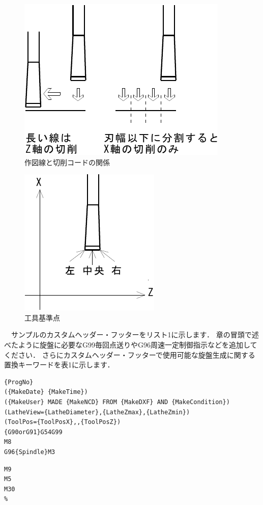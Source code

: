 \begin{minipage}{0.6\textwidth}
\begin{figure}[H]
\centering
\includegraphics{No2/fig/groove1-crop.pdf}
\caption{作図線と切削コードの関係}
\label{fig:ngroove1.pdf}
\end{figure}
\end{minipage}
\begin{minipage}{0.4\textwidth}
\begin{figure}[H]
\centering
\includegraphics{No2/fig/groove2-crop.pdf}
\caption{工具基準点}
\label{fig:groove2.pdf}
\end{figure}
\end{minipage}

\vspace*{1zh}
　サンプルのカスタムヘッダー・フッターをリスト1に示します．
章の冒頭で述べたように旋盤に必要なG99毎回点送りやG96周速一定制御指示などを追加してください．
さらにカスタムヘッダー・フッターで使用可能な旋盤生成に関する置換キーワードを表1に示します．

\begin{minipage}[t]{0.75\textwidth}
\begin{lstlisting}[caption=Header.txt,numbers=none,label=lst:header.txt]
%
{ProgNo}
({MakeDate} {MakeTime})
({MakeUser} MADE {MakeNCD} FROM {MakeDXF} AND {MakeCondition})
(LatheView={LatheDiameter},{LatheZmax},{LatheZmin})
(ToolPos={ToolPosX},,{ToolPosZ})
{G90orG91}G54G99
M8
G96{Spindle}M3
\end{lstlisting}
\end{minipage}
\begin{minipage}[t]{0.25\textwidth}
\begin{lstlisting}[caption=Footer.txt,numbers=none,label=lst:footer.txt]
M9
M5
M30
%
\end{lstlisting}
\end{minipage}


